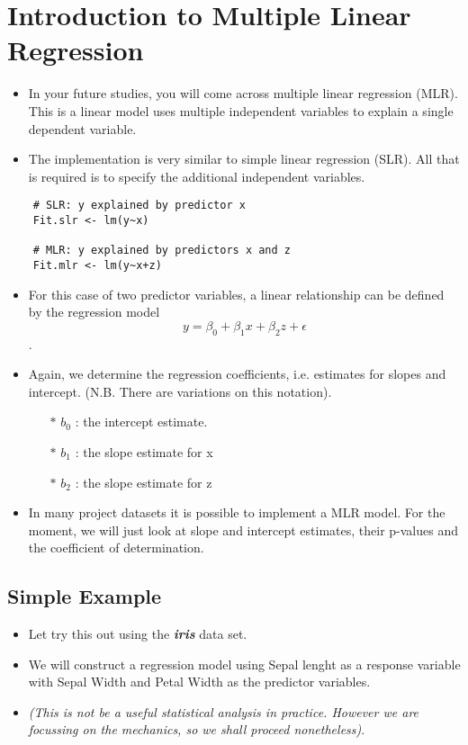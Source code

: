 \documentclass[a4paper,12pt]{article}
\begin{document}
\section{Introduction to Multiple Linear Regression}
\begin{itemize}
\item In your future studies, you will come across multiple linear regression (MLR). This is a linear model uses multiple independent variables to explain a single dependent variable.

\item The implementation is very similar to simple linear regression (SLR). All that is required is to specify the additional independent variables.

\end{itemize}

\begin{framed}
	\begin{verbatim}
	# SLR: y explained by predictor x
	Fit.slr <- lm(y~x)    
	
	# MLR: y explained by predictors x and z
	Fit.mlr <- lm(y~x+z)  
	\end{verbatim}
\end{framed}

\begin{itemize}
\item For this case of two predictor variables, a  linear relationship can be defined by the regression model  \[y =\beta_0 + \beta_1x + \beta_2z + \epsilon\].

\item Again, we determine the regression coefficients, i.e. estimates for slopes and intercept. (N.B. There are variations on this notation).
\begin{itemize}
	\item[$\ast$]	$b_0$ : the intercept estimate.
	\item[$\ast$]	$b_1$  : the slope estimate for x
	\item[$\ast$]	$b_2$  : the slope estimate for z
\end{itemize}






\item In many project datasets it is possible to implement a MLR model. For the moment, we will just look at slope and intercept estimates, their p-values and the coefficient of determination.
\end{itemize}
\newpage
\subsection*{Simple Example}
\begin{itemize}
\item Let try this out using the \textbf{\textit{iris}} data set. 
\item We will construct a regression model using Sepal lenght as a response variable with Sepal Width and Petal Width as the predictor variables.
\item \textit{(This is not be a useful statistical analysis in practice. However we are focussing on the mechanics, so we shall proceed nonetheless)}.
\end{itemize}
\end{document}
